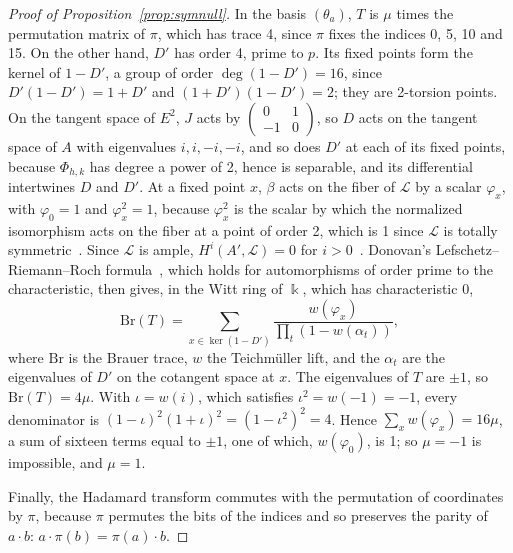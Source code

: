 \documentclass[version=preprint]{iacrcc}
\begin{document}
\begin{proof}[Proof of Proposition~\ref{prop:symnull}]
        In the basis $(\theta_a)$, $T$ is $\mu$ times the permutation matrix of
        $\pi$, which has trace 4, since $\pi$ fixes the indices 0, 5, 10 and 15.
        On the other hand, $D'$ has order 4, prime to $p$. Its fixed points form
        the kernel of $1 - D'$, a group of order $\deg(1 - D') = 16$, since $D'(1
        - D') = 1 + D'$ and $(1 + D')(1 - D') = 2$; they are 2-torsion points. On
        the tangent space of $E^2$, $J$ acts by $\left(\begin{smallmatrix} 0 & 1 \\
        -1 & 0 \end{smallmatrix}\right)$, so $D$ acts on the tangent space of $A$
        with eigenvalues $i, i, -i, -i$, and so does $D'$ at each of its fixed
        points, because $\Phi_{h,k}$ has degree a power of 2, hence is separable,
        and its differential intertwines $D$ and $D'$. At a fixed point $x$,
        $\beta$ acts on the fiber of $\mathcal L$ by a scalar $\varphi_x$, with
        $\varphi_0 = 1$ and $\varphi_x^2 = 1$, because $\varphi_x^2$ is the scalar
        by which the normalized isomorphism acts on the fiber at a point of order
        2, which is 1 since $\mathcal L$ is totally symmetric~\cite[p.~305,
        Proposition 1]{Mum66}. Since $\mathcal L$ is ample, $H^i(A', \mathcal L)
        = 0$ for $i > 0$~\cite[\S 16, p.~150]{Mum74}. Donovan's
        Lefschetz--Riemann--Roch formula~\cite[Corollary 5.5, with Lemmas 4.2 and
        4.3]{Don69}, which holds for automorphisms of order prime to the
        characteristic, then gives, in the Witt ring of $\Bbbk$, which has
        characteristic 0,
        \[
        \mathrm{Br}(T) = \sum_{x \in \ker(1 - D')} \frac{w(\varphi_x)}{\prod_t (1
        - w(\alpha_t))},
        \]
        where $\mathrm{Br}$ is the Brauer trace, $w$ the Teichmüller lift, and the
        $\alpha_t$ are the eigenvalues of $D'$ on the cotangent space at $x$. The
        eigenvalues of $T$ are $\pm 1$, so $\mathrm{Br}(T) = 4\mu$. With $\iota =
        w(i)$, which satisfies $\iota^2 = w(-1) = -1$, every denominator is $(1 -
        \iota)^2 (1 + \iota)^2 = (1 - \iota^2)^2 = 4$. Hence $\sum_x w(\varphi_x) =
        16\mu$, a sum of sixteen terms equal to $\pm 1$, one of which, $w(\varphi_0)$,
        is 1; so $\mu = -1$ is impossible, and $\mu = 1$.

        Finally, the Hadamard transform commutes with the permutation of
        coordinates by $\pi$, because $\pi$ permutes the bits of the indices and
        so preserves the parity of $a \cdot b$: $a \cdot \pi(b) = \pi(a) \cdot b$.
    \end{proof}
\end{document}
